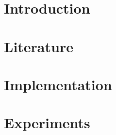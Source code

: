 \documentclass[twoside]{ctuthesis}
\theoremstyle{plain}
\theoremstyle{definition}
\theoremstyle{note}
\begin{document}
\maketitle

\chapter{Introduction}


\chapter{Literature}







\chapter{Implementation}


\chapter{Experiments}


%

%

\appendix

\printindex






\end{document}
